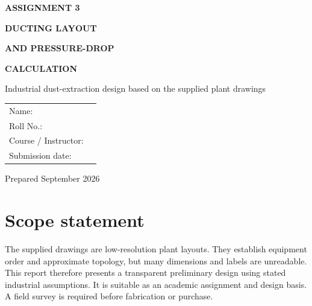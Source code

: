 \documentclass[11pt,a4paper]{article}
\begin{document}
\begin{titlepage}
\pagecolor{navy}\color{white}
\vspace*{22mm}
{\color{accent}\Large\bfseries ASSIGNMENT 3\par}
\vspace{8mm}
{\Huge\bfseries DUCTING LAYOUT\par}
\vspace{2mm}
{\Huge\bfseries AND PRESSURE-DROP\par}
\vspace{2mm}
{\Huge\bfseries CALCULATION\par}
\vspace{12mm}
{\large Industrial dust-extraction design based on the supplied plant drawings\par}
\vspace{18mm}
\vfill
\begin{tabular}{p{48mm}p{95mm}}
Name: & \hrulefill\\[7mm]
Roll No.: & \hrulefill\\[7mm]
Course / Instructor: & \hrulefill\\[7mm]
Submission date: & \hrulefill
\end{tabular}
\vspace{12mm}

{\small Prepared September 2026}
\end{titlepage}
\nopagecolor\color{black}

\section*{Scope statement}
The supplied drawings are low-resolution plant layouts. They establish equipment order and approximate topology, but many dimensions and labels are unreadable. This report therefore presents a transparent preliminary design using stated industrial assumptions. It is suitable as an academic assignment and design basis. A field survey is required before fabrication or purchase.
\end{document}
